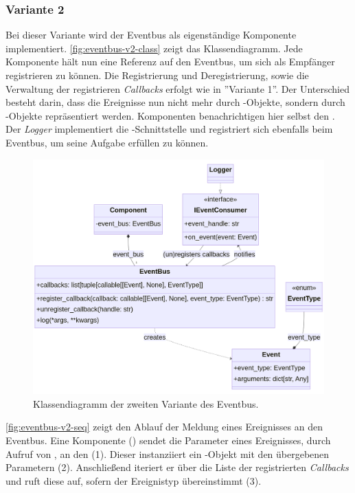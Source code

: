 \subsubsection*{Variante 2}

Bei dieser Variante wird der Eventbus als eigenständige Komponente implementiert. \autoref{fig:eventbus-v2-class} zeigt das Klassendiagramm. Jede Komponente hält nun eine Referenz auf den Eventbus, um sich als Empfänger registrieren zu können. Die Registrierung und Deregistrierung, sowie die Verwaltung der registrieren \emph{Callbacks} erfolgt wie in ''Variante 1''. Der Unterschied besteht darin, dass die Ereignisse nun nicht mehr durch -Objekte, sondern durch -Objekte repräsentiert werden. Komponenten benachrichtigen hier selbst den . Der \emph{Logger} implementiert die -Schnittstelle und registriert sich ebenfalls beim Eventbus, um seine Aufgabe erfüllen zu können.

\begin{figure}[!ht]
	\centering
	\includegraphics[width=1.0\linewidth]{images/diagrams/eventbus-v2-class.png}
	\caption{Klassendiagramm der zweiten Variante des Eventbus.}
	\label{fig:eventbus-v2-class}
\end{figure}

\autoref{fig:eventbus-v2-seq} zeigt den Ablauf der Meldung eines Ereignisses an den Eventbus. Eine Komponente () sendet die Parameter eines Ereignisses, durch Aufruf von , an den  (1). Dieser instanziiert ein -Objekt mit den übergebenen Parametern (2). Anschließend iteriert er über die Liste der registrierten \emph{Callbacks} und ruft diese auf, sofern der Ereignistyp übereinstimmt (3).

